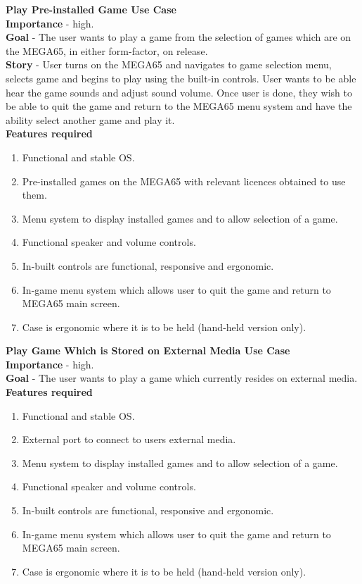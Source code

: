 \textbf{Play Pre-installed Game Use Case} \\
\textbf{Importance} - high. \\
\textbf{Goal} - The user wants to play a game from the selection of games which are on the MEGA65, in either form-factor, on release. \\
\textbf{Story} - User turns on the MEGA65 and navigates to game selection menu, selects game and begins to play using the built-in controls. User wants to be able hear the game sounds and adjust sound volume. Once user is done, they wish to be able to quit the game and return to the MEGA65 menu system and have the ability select another game and play it. \\
\textbf{Features required} \begin{enumerate}
\item Functional and stable OS.
\item Pre-installed games on the MEGA65 with relevant licences obtained to use them.
\item Menu system to display installed games and to allow selection of a game.
\item Functional speaker and volume controls.
\item In-built controls are functional, responsive and ergonomic.
\item In-game menu system which allows user to quit the game and return to MEGA65 main screen. 
\item Case is ergonomic where it is to be held (hand-held version only).\\
\end{enumerate}


\textbf{Play Game Which is Stored on External Media Use Case} \\
\textbf{Importance} - high. \\
\textbf{Goal} - The user wants to play a game which currently resides on external media. \\
\textbf{Features required} \begin{enumerate}
\item Functional and stable OS.
\item External port to connect to users external media.
\item Menu system to display installed games and to allow selection of a game.
\item Functional speaker and volume controls.
\item In-built controls are functional, responsive and ergonomic.
\item In-game menu system which allows user to quit the game and return to MEGA65 main screen. 
\item Case is ergonomic where it is to be held (hand-held version only).\\
\end{enumerate}



